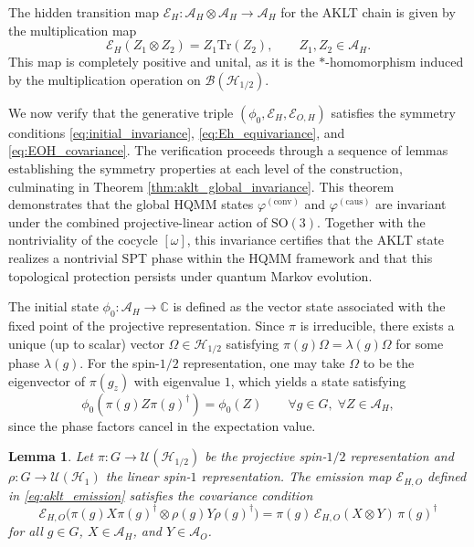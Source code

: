 \documentclass[12pt,a4paper]{article}
\newtheorem{lemma}[theorem]{Lemma}
\begin{document}
The hidden transition map $\mathcal{E}_H: \mathcal{A}_H \otimes \mathcal{A}_H \to \mathcal{A}_H$ for the AKLT chain is given by the multiplication map
\begin{equation}
\mathcal{E}_H(Z_1 \otimes Z_2) = Z_1 \mathrm{Tr}(Z_2), \qquad Z_1, Z_2 \in \mathcal{A}_H.
\label{eq:aklt_transition}
\end{equation}
This map is completely positive and unital, as it is the $*$-homomorphism induced by the multiplication operation on $\mathcal{B}(\mathcal{H}_{1/2})$.


We now verify that the generative triple $(\phi_0, \mathcal{E}_H, \mathcal{E}_{O,H})$ satisfies the symmetry conditions \eqref{eq:initial_invariance}, \eqref{eq:Eh_equivariance}, and \eqref{eq:EOH_covariance}. The verification proceeds through a sequence of lemmas establishing the symmetry properties at each level of the construction, culminating in Theorem \ref{thm:aklt_global_invariance}. This theorem demonstrates that the global HQMM states $\varphi^{(\text{conv})}$ and $\varphi^{(\text{caus})}$ are invariant under the combined projective-linear action of $\mathrm{SO}(3)$. Together with the nontriviality of the cocycle $[\omega]$, this invariance certifies that the AKLT state realizes a nontrivial SPT phase within the HQMM framework and that this topological protection persists under quantum Markov evolution.


The initial state $\phi_0: \mathcal{A}_H \to \mathbb{C}$ is defined as the vector state associated with the fixed point of the projective representation. Since $\pi$ is irreducible, there exists a unique (up to scalar) vector $\Omega \in \mathcal{H}_{1/2}$ satisfying $\pi(g)\Omega = \lambda(g)\Omega$ for some phase $\lambda(g)$. For the spin-$1/2$ representation, one may take $\Omega$ to be the eigenvector of $\pi(g_z)$ with eigenvalue $1$, which yields a state satisfying
\begin{equation}
\phi_0(\pi(g) Z \pi(g)^\dagger) = \phi_0(Z) \qquad \forall g \in G,\; \forall Z \in \mathcal{A}_H,
\label{eq:aklt_initial_invariance}
\end{equation}
since the phase factors cancel in the expectation value.

\begin{lemma}\label{lem:aklt_emission_covariance}
Let $\pi: G \to \mathcal{U}(\mathcal{H}_{1/2})$ be the projective spin-$1/2$ representation and $\rho: G \to \mathcal{U}(\mathcal{H}_1)$ the linear spin-$1$ representation. The emission map $\mathcal{E}_{H,O}$ defined in \eqref{eq:aklt_emission} satisfies the covariance condition
\begin{equation}
\mathcal{E}_{H,O}\bigl( \pi(g) X \pi(g)^\dagger \otimes \rho(g) Y \rho(g)^\dagger \bigr) = \pi(g) \, \mathcal{E}_{H,O}(X \otimes Y) \, \pi(g)^\dagger
\label{eq:aklt_emission_covariance}
\end{equation}
for all $g \in G$, $X \in \mathcal{A}_H$, and $Y \in \mathcal{A}_O$.
\end{lemma}
\end{document}
